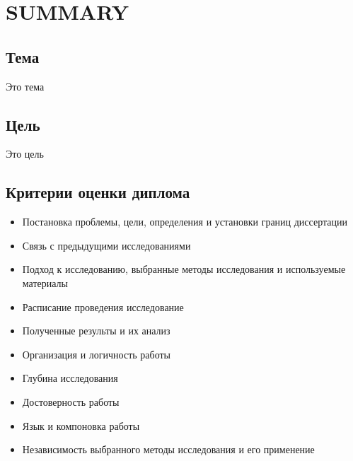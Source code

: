 \section{SUMMARY}

\subsection{Тема}
Это тема

\subsection{Цель}
Это цель

\subsection{Критерии оценки диплома}
\begin{itemize}
  \item Постановка проблемы, цели, определения и установки границ диссертации
  \item Связь с предыдущими исследованиями
  \item Подход к исследованию, выбранные методы исследования и
  используемые материалы
  \item Расписание проведения исследование
  \item Полученные результы и их анализ
  \item Организация и логичность работы
  \item Глубина исследования
  \item Достоверность работы
  \item Язык и компоновка работы
  \item Независимость выбранного методы исследования и его применение
\end{itemize}
